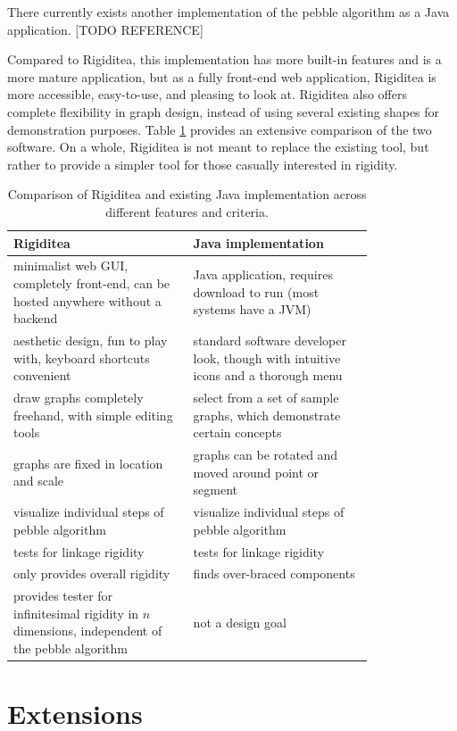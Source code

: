 \documentclass[aps,prd,final,twocolumn,letterpaper,nofootinbib]{revtex4-1}
\begin{document}
There currently exists another
implementation of the pebble algorithm as a Java application.
[TODO REFERENCE]

Compared to Rigiditea, this implementation
has more built-in features and is a more mature application,
but as a fully front-end web application,
Rigiditea is more accessible, easy-to-use, and pleasing to look at.
Rigiditea also offers complete flexibility in graph design,
instead of using several existing shapes for demonstration purposes.
Table \ref{tab:comp} provides an extensive comparison of the two software.
On a whole, Rigiditea is not meant to replace the existing tool,
but rather to provide a simpler tool for those casually interested
in rigidity.


\begin{table}[ht]
\def\arraystretch{1.5}
\caption{Comparison of Rigiditea and existing Java implementation
across different features and criteria.}
\begin{tabular}{p{0.4\linewidth} | p{0.4\linewidth}}
Rigiditea & Java implementation \\ \hline
minimalist web GUI, completely front-end, can be hosted anywhere
without a backend &
Java application, requires download to run (most systems have a JVM) \\
aesthetic design, fun to play with, keyboard shortcuts convenient &
standard software developer look, though with intuitive icons
and a thorough menu\\
draw graphs completely freehand,
with simple editing tools &
select from a set of sample graphs,
which demonstrate certain concepts \\
graphs are fixed in location and scale &
graphs can be rotated and moved around point or segment \\
visualize individual steps of pebble algorithm &
visualize individual steps of pebble algorithm\\
tests for linkage rigidity & tests for linkage rigidity\\
only provides overall rigidity & finds over-braced components \\
provides tester for infinitesimal rigidity in $n$ dimensions,
independent of the pebble algorithm
& not a design goal
\end{tabular}
\label{tab:comp}
\end{table}

\section{Extensions}
\end{document}
